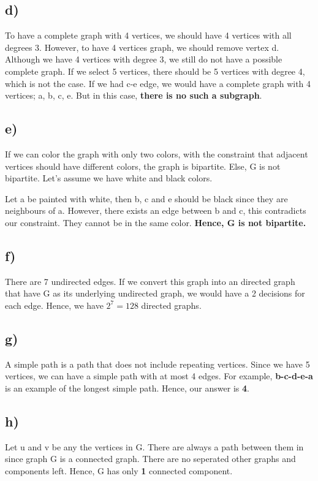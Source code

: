 \documentclass[12pt]{article}
\begin{document}
\subsection*{d) }
To have a complete graph with 4 vertices, we should have 4 vertices with all degrees 3. However, to have 4 vertices graph, we should remove vertex d. Although we have 4 vertices with degree 3, we still do not have a possible complete graph. If we select 5 vertices, there should be 5 vertices with degree 4, which is not the case. If we had c-e edge, we would have a complete graph with 4 vertices; a, b, c, e. But in this case, \textbf{there is no such a subgraph}.

\subsection*{e) }
If we can color the graph with only two colors, with the constraint that adjacent vertices should have different colors, the graph is bipartite. Else, G is not bipartite. Let's assume we have white and black colors.

Let a be painted with white, then b, c and e should be black since they are neighbours of a. However, there exists an edge between b and c, this contradicts our constraint. They cannot be in the same color. \textbf{Hence, G is not bipartite.}\\ 

\subsection*{f) }

There are 7 undirected edges. If we convert this graph into an directed graph that have G as its underlying undirected graph, we would have a 2 decisions for each edge. Hence, we have \textbf{$2^7 = 128$} directed graphs.

\subsection*{g) }
A simple path is a path that does not include repeating vertices. Since we have 5 vertices, we can have a simple path with at most 4 edges. For example, \textbf{b-c-d-e-a} is an example of the longest simple path. Hence, our answer is \textbf{4}.

\subsection*{h) }
Let u and v be any the vertices in G. There are always a path between them in since graph G is a connected graph. There are no seperated other graphs and components left. Hence, G has only \textbf{1} connected component. 
\end{document}
